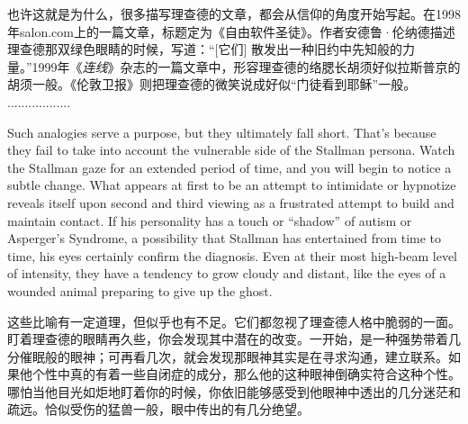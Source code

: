 \ifdefined\chs
也许这就是为什么，很多描写理查德的文章，都会从信仰的角度开始写起。在1998年salon.com上的一篇文章，标题定为《自由软件圣徒》。作者安德鲁·伦纳德描述理查德那双绿色眼睛的时候，写道：“[它们] 散发出一种旧约中先知般的力量。”1999年《\textit{连线}》杂志的一篇文章中，形容理查德的络腮长胡须好似拉斯普京的胡须一般。《伦敦卫报》则把理查德的微笑说成好似“门徒看到耶稣”一般。 ..................
\fi

\ifdefined\eng
Such analogies serve a purpose, but they ultimately fall short. That's because they fail to take into account the vulnerable side of the Stallman persona. Watch the Stallman gaze for an extended period of time, and you will begin to notice a subtle change. What appears at first to be an attempt to intimidate or hypnotize reveals itself upon second and third viewing as a frustrated attempt to build and maintain contact. If his personality has a touch or ``shadow'' of autism or Asperger's Syndrome, a possibility that Stallman has entertained from time to time, his eyes certainly confirm the diagnosis. Even at their most high-beam level of intensity, they have a tendency to grow cloudy and distant, like the eyes of a wounded animal preparing to give up the ghost.
\fi

\ifdefined\chs
这些比喻有一定道理，但似乎也有不足。它们都忽视了理查德人格中脆弱的一面。盯着理查德的眼睛再久些，你会发现其中潜在的改变。一开始，是一种强势带着几分催眠般的眼神；可再看几次，就会发现那眼神其实是在寻求沟通，建立联系。如果他个性中真的有着一些自闭症的成分，那么他的这种眼神倒确实符合这种个性。哪怕当他目光如炬地盯着你的时候，你依旧能够感受到他眼神中透出的几分迷茫和疏远。恰似受伤的猛兽一般，眼中传出的有几分绝望。
\fi

